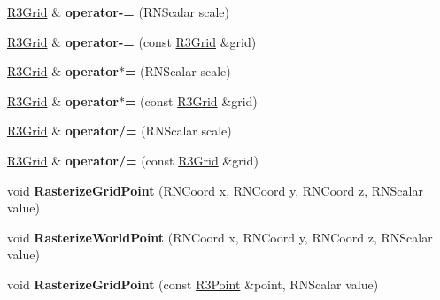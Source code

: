\begin{DoxyCompactItemize}
\item 
\hyperlink{class_r3_grid}{R3\+Grid} \& {\bfseries operator-\/=} (R\+N\+Scalar scale)\hypertarget{class_r3_grid_a4f8ea398e5f7cbf278b4277835c87660}{}\label{class_r3_grid_a4f8ea398e5f7cbf278b4277835c87660}

\item 
\hyperlink{class_r3_grid}{R3\+Grid} \& {\bfseries operator-\/=} (const \hyperlink{class_r3_grid}{R3\+Grid} \&grid)\hypertarget{class_r3_grid_ae5e799bf941da4baf6ebb263abe25408}{}\label{class_r3_grid_ae5e799bf941da4baf6ebb263abe25408}

\item 
\hyperlink{class_r3_grid}{R3\+Grid} \& {\bfseries operator$\ast$=} (R\+N\+Scalar scale)\hypertarget{class_r3_grid_a9fea1d5d839e44feaa3374efeee1013b}{}\label{class_r3_grid_a9fea1d5d839e44feaa3374efeee1013b}

\item 
\hyperlink{class_r3_grid}{R3\+Grid} \& {\bfseries operator$\ast$=} (const \hyperlink{class_r3_grid}{R3\+Grid} \&grid)\hypertarget{class_r3_grid_afe86741fec425bac6755cc4cb61cb5fc}{}\label{class_r3_grid_afe86741fec425bac6755cc4cb61cb5fc}

\item 
\hyperlink{class_r3_grid}{R3\+Grid} \& {\bfseries operator/=} (R\+N\+Scalar scale)\hypertarget{class_r3_grid_abfb6096d07f786be42384cdb7083be6d}{}\label{class_r3_grid_abfb6096d07f786be42384cdb7083be6d}

\item 
\hyperlink{class_r3_grid}{R3\+Grid} \& {\bfseries operator/=} (const \hyperlink{class_r3_grid}{R3\+Grid} \&grid)\hypertarget{class_r3_grid_ade9c6a6ae520a1eea2db568db2659358}{}\label{class_r3_grid_ade9c6a6ae520a1eea2db568db2659358}

\item 
void {\bfseries Rasterize\+Grid\+Point} (R\+N\+Coord x, R\+N\+Coord y, R\+N\+Coord z, R\+N\+Scalar value)\hypertarget{class_r3_grid_af6f60731d4e8208663439880ec8008f4}{}\label{class_r3_grid_af6f60731d4e8208663439880ec8008f4}

\item 
void {\bfseries Rasterize\+World\+Point} (R\+N\+Coord x, R\+N\+Coord y, R\+N\+Coord z, R\+N\+Scalar value)\hypertarget{class_r3_grid_ab468196f58d0857cee19283ffec5fc25}{}\label{class_r3_grid_ab468196f58d0857cee19283ffec5fc25}

\item 
void {\bfseries Rasterize\+Grid\+Point} (const \hyperlink{class_r3_point}{R3\+Point} \&point, R\+N\+Scalar value)\hypertarget{class_r3_grid_a05fcb06aef8667cfbfb469f8dc2421dc}{}\label{class_r3_grid_a05fcb06aef8667cfbfb469f8dc2421dc}


\end{DoxyCompactItemize}
